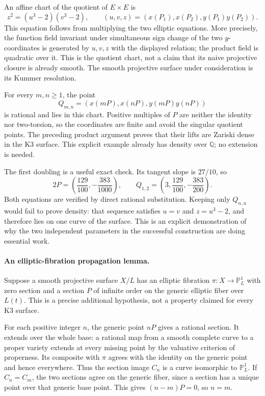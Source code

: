 \documentclass[11pt]{article}
\begin{document}
An affine chart of the quotient of $E\times E$ is
\begin{equation}\label{ra483:surface}
 z^2=(u^3-2)(v^3-2),
 \qquad (u,v,z)=(x(P_1),x(P_2),y(P_1)y(P_2)).
\end{equation}
This equation follows from multiplying the two elliptic equations. More
precisely, the function field invariant under simultaneous sign change
of the two $y$-coordinates is generated by $u,v,z$ with the displayed
relation; the product field is quadratic over it. This is the quotient
chart, not a claim that its naive projective closure is already smooth.
The smooth projective surface under consideration is its Kummer resolution.

For every $m,n\ge1$, the point
\[
 Q_{m,n}=(x(mP),x(nP),y(mP)y(nP))
\]
is rational and lies in this chart. Positive multiples of $P$ are neither
the identity nor two-torsion, so the coordinates are finite and avoid the
singular quotient points. The preceding product argument proves that their
lifts are Zariski dense in the K3 surface. This explicit example already
has density over $\mathbb Q$; no extension is needed.

The first doubling is a useful exact check. Its tangent slope is $27/10$,
so
\[
 2P=\left(\frac{129}{100},-\frac{383}{1000}\right),\qquad
 Q_{1,2}=\left(3,\frac{129}{100},-\frac{383}{200}\right).
\]
Both equations are verified by direct rational substitution. Keeping only
$Q_{n,n}$ would fail to prove density: that sequence satisfies $u=v$ and
$z=u^3-2$, and therefore lies on one curve of the surface. This is an
explicit demonstration of why the two independent parameters in the
successful construction are doing essential work.

\paragraph{An elliptic-fibration propagation lemma.}
Suppose a smooth projective surface $X/L$ has an elliptic fibration
$\pi:X\to\mathbb P^1_L$ with zero section and a section $P$ of infinite
order on the generic elliptic fiber over $L(t)$. This is a precise
additional hypothesis, not a property claimed for every K3 surface.

For each positive integer $n$, the generic point $nP$ gives a rational
section. It extends over the whole base: a rational map from a smooth
complete curve to a proper variety extends at every missing point by the
valuative criterion of properness. Its composite with $\pi$ agrees with
the identity on the generic point and hence everywhere. Thus the section
image $C_n$ is a curve isomorphic to $\mathbb P^1_L$. If $C_n=C_m$, the
two sections agree on the generic fiber, since a section has a unique point
over that generic base point. This gives $(n-m)P=0$, so $n=m$.
\end{document}

